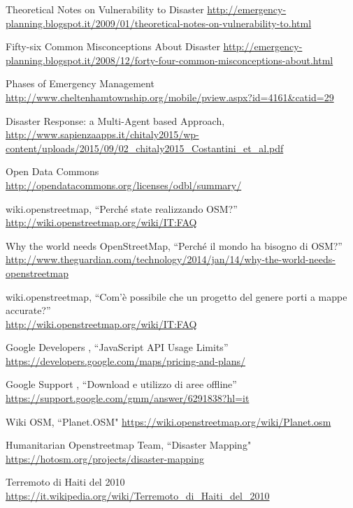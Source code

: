 \begin{thebibliography}{99}

Theoretical Notes on Vulnerability to Disaster
\url{http://emergency-planning.blogspot.it/2009/01/theoretical-notes-on-vulnerability-to.html}

Fifty-six Common Misconceptions About Disaster
\url{http://emergency-planning.blogspot.it/2008/12/forty-four-common-misconceptions-about.html}

Phases of Emergency Management
\url{http://www.cheltenhamtownship.org/mobile/pview.aspx?id=4161&catid=29}

Disaster Response: a Multi-Agent based Approach,
\url{http://www.sapienzaapps.it/chitaly2015/wp-content/uploads/2015/09/02_chitaly2015_Costantini_et_al.pdf}

Open Data Commons  \\
\url{http://opendatacommons.org/licenses/odbl/summary/}

wiki.openstreetmap, ``Perché state realizzando OSM?'' \\
\url{http://wiki.openstreetmap.org/wiki/IT:FAQ}

Why the world needs OpenStreetMap, ``Perché il mondo ha bisogno di OSM?''
\url{http://www.theguardian.com/technology/2014/jan/14/why-the-world-needs-openstreetmap}

wiki.openstreetmap, ``Com'è possibile che un progetto del genere porti a mappe accurate?'' \\
\url{http://wiki.openstreetmap.org/wiki/IT:FAQ}

Google Developers ,  ``JavaScript API Usage Limits''
\url{https://developers.google.com/maps/pricing-and-plans/}


Google Support ,  ``Download e utilizzo di aree offline''
\url{https://support.google.com/gmm/answer/6291838?hl=it}

Wiki OSM,  ``Planet.OSM"
\url{https://wiki.openstreetmap.org/wiki/Planet.osm}

Humanitarian Openstreetmap Team,  ``Disaster Mapping"
\url{https://hotosm.org/projects/disaster-mapping}

Terremoto di Haiti del 2010
\url{https://it.wikipedia.org/wiki/Terremoto_di_Haiti_del_2010}


\end{thebibliography}
